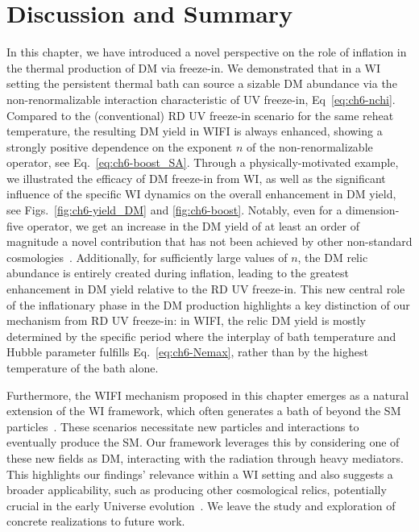 \section{Discussion and Summary}
\label{sec:ch6-Dis}

In this chapter, we have introduced a novel perspective on the role of inflation in the thermal production of DM via freeze-in. We demonstrated that in a WI setting the persistent thermal bath can source a sizable DM abundance via the non-renormalizable interaction characteristic of UV freeze-in, Eq~\eqref{eq:ch6-nchi}. Compared to the (conventional) RD UV freeze-in scenario for the same reheat temperature, the resulting DM yield in WIFI is always enhanced,  showing a strongly positive dependence on the exponent $n$ of the non-renormalizable operator, see Eq.~\eqref{eq:ch6-boost_SA}.
Through a physically-motivated example, we illustrated the efficacy of DM freeze-in from WI, as well as the significant influence of the specific
WI dynamics on the overall enhancement in DM yield, see Figs.~\ref{fig:ch6-yield_DM} and \ref{fig:ch6-boost}. Notably, even for a dimension-five operator, we get an increase in the DM yield of at least
an order of magnitude a novel contribution that has not been achieved by other non-standard cosmologies~\cite{Bernal:2019mhf}. Additionally, for sufficiently large values of $n$, the DM relic abundance is entirely created during inflation, leading to the greatest enhancement in DM yield relative to the RD UV freeze-in.  This new central role of the inflationary phase in the DM production highlights a key distinction of our mechanism from RD UV freeze-in: in WIFI, the relic DM yield is mostly determined by the specific period where the interplay of bath temperature and Hubble parameter fulfills Eq.~\eqref{eq:ch6-Nemax}, rather than by the highest temperature of the bath alone.

Furthermore, the WIFI mechanism proposed in this chapter emerges as a natural extension of the WI framework, which often generates a bath of beyond the SM particles~\cite{ Berera:2008ar,Berera:2002sp, Moss:2006gt, Bastero-Gil:2016qru, Berghaus:2019whh}. These scenarios necessitate new particles and interactions to eventually produce the SM. Our framework leverages this by considering one of these new fields as DM, interacting with the radiation through heavy mediators. This  highlights our findings' relevance within a WI setting and also suggests a broader applicability, such as producing other  cosmological relics, potentially crucial in the early Universe evolution~\cite{Taylor:2000jw}.
We leave the study and exploration of concrete realizations to future work.



